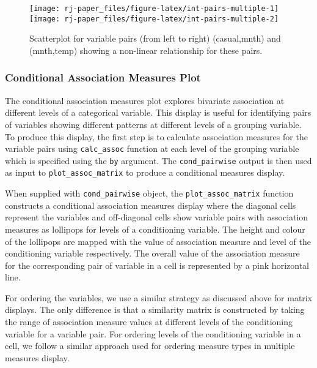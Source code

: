 \begin{figure}
\texttt{[image: rj-paper\_files/figure-latex/int-pairs-multiple-1]} \texttt{[image: rj-paper\_files/figure-latex/int-pairs-multiple-2]} \caption{Scatterplot for variable pairs (from left to right) (casual,mnth) and (mnth,temp) showing a non-linear relationship for these pairs.}\label{fig:int-pairs-multiple}
\end{figure}

\hypertarget{conditional-association-measures-plot}{%
\subsubsection{Conditional Association Measures Plot}\label{conditional-association-measures-plot}}

The conditional association measures plot explores bivariate association at different levels of a categorical variable. This display is useful for identifying pairs of variables showing different patterns at different levels of a grouping variable. To produce this display, the first step is to calculate association measures for the variable pairs using \texttt{calc\_assoc} function at each level of the grouping variable which is specified using the \texttt{by} argument. The \texttt{cond\_pairwise} output is then used as input to \texttt{plot\_assoc\_matrix} to produce a conditional measures display.

When supplied with \texttt{cond\_pairwise} object, the \texttt{plot\_assoc\_matrix} function constructs a conditional association measures display where the diagonal cells represent the variables and off-diagonal cells show variable pairs with association measures as lollipops for levels of a conditioning variable. The height and colour of the lollipops are mapped with the value of association measure and level of the conditioning variable respectively. The overall value of the association measure for the corresponding pair of variable in a cell is represented by a pink horizontal line.

For ordering the variables, we use a similar strategy as discussed above for matrix displays. The only difference is that a similarity matrix is constructed by taking the range of association measure values at different levels of the conditioning variable for a variable pair. For ordering levels of the conditioning variable in a cell, we follow a similar approach used for ordering measure types in multiple measures display.


